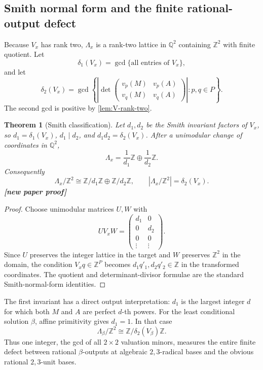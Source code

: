 \documentclass[11pt,oneside]{article}
\newtheorem{theorem}{Theorem}[section]
\theoremstyle{definition}
\theoremstyle{remark}
\newcommand{\Z}{\mathbb Z}
\newcommand{\Q}{\mathbb Q}
\newcommand{\vpp}[2]{v_{#1}\!\left(#2\right)}
\newcommand{\statusnew}{\textcolor{NewViolet}{\textbf{[new paper proof]}}}
\begin{document}
\subsection{Smith normal form and the finite rational-output defect}

Because $V_x$ has rank two, $\Lambda_x$ is a rank-two lattice in $\Q^2$ containing $\Z^2$
with finite quotient.  Let
\[
 \delta_1(V_x)=\gcd\{\text{all entries of }V_x\},
\]
and let
\[
 \delta_2(V_x)=\gcd\left\{
  \left|\det\begin{pmatrix}
   \vpp pM&\vpp pA\\
   \vpp qM&\vpp qA
  \end{pmatrix}\right|:p,q\in P
 \right\}.
\]
The second gcd is positive by \cref{lem:V-rank-two}.

\begin{theorem}[Smith classification]\label{thm:smith-lattice}
Let $d_1,d_2$ be the Smith invariant factors of $V_x$, so
$d_1=\delta_1(V_x)$, $d_1\mid d_2$, and $d_1d_2=\delta_2(V_x)$.  After a unimodular change of
coordinates in $\Q^2$,
\[
  \Lambda_x=\frac1{d_1}\Z\oplus\frac1{d_2}\Z.
\]
Consequently
\[
  \Lambda_x/\Z^2\cong\Z/d_1\Z\oplus\Z/d_2\Z,
  \qquad
  |\Lambda_x/\Z^2|=\delta_2(V_x).
\]
\statusnew
\end{theorem}

\begin{proof}
Choose unimodular matrices $U,W$ with
\[
 UV_xW=\begin{pmatrix}d_1&0\\0&d_2\\0&0\\\vdots&\vdots\end{pmatrix}.
\]
Since $U$ preserves the integer lattice in the target and $W$ preserves $\Z^2$ in the
domain, the condition $V_xq\in\Z^P$ becomes
$d_1q'_1,d_2q'_2\in\Z$ in the transformed coordinates.  The quotient and determinant-divisor
formulae are the standard Smith-normal-form identities.
\end{proof}

The first invariant has a direct output interpretation: $d_1$ is the largest integer $d$
for which both $M$ and $A$ are perfect $d$-th powers.  For the least conditional solution
$\beta$, affine primitivity gives $d_1=1$.  In that case
\[
  \Lambda_\beta/\Z^2\cong\Z/\delta_2(V_\beta)\Z.
\]
Thus one integer, the gcd of all $2\times2$ valuation minors, measures the entire finite defect
between rational $\beta$-outputs at algebraic $2,3$-radical bases and the obvious rational
$2,3$-unit bases.
\end{document}
